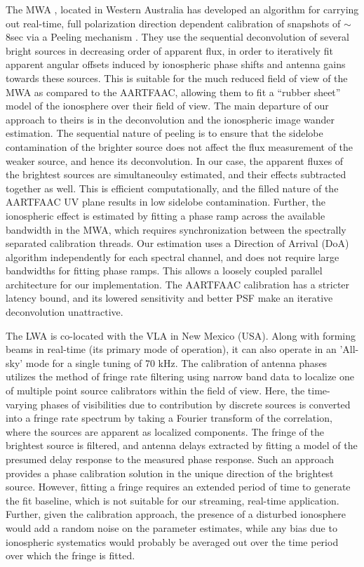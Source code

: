 \documentclass{aa}
\begin{document}
The MWA \citep{lonsdale2009murchison}, located in Western Australia has developed
an algorithm  for carrying out real-time, full  polarization direction dependent
calibration     of     snapshots     of     $\sim$8sec     via     a     Peeling
mechanism \citep{mitchell2008real}.   They use  the  sequential deconvolution  of
several  bright  sources in  decreasing  order of  apparent  flux,  in order  to
iteratively fit apparent angular offsets induced by ionospheric phase shifts and
antenna gains towards these sources. This is suitable for the much reduced field
of view of the MWA as compared  to the AARTFAAC, allowing them to fit a ``rubber
sheet'' model of the ionosphere over their field of view.  The main departure of
our approach to theirs is in  the deconvolution and the ionospheric image wander
estimation.  The  sequential nature  of peeling is  to ensure that  the sidelobe
contamination of the brighter source does not affect the flux measurement of the
weaker source, and hence its deconvolution.  In our case, the apparent fluxes of
the brightest sources are simultaneoulsy estimated, and their effects subtracted
together as  well. This is efficient  computationally, and the  filled nature of
the  AARTFAAC UV  plane  results  in low  sidelobe  contamination. Further,  the
ionospheric effect  is estimated  by fitting a  phase ramp across  the available
bandwidth  in the  MWA, which  requires synchronization  between  the spectrally
separated calibration threads.  Our estimation uses a Direction of Arrival (DoA)
algorithm independently  for each spectral  channel, and does not  require large
bandwidths  for fitting  phase ramps.   This allows  a loosely  coupled parallel
architecture for  our implementation.  The  AARTFAAC calibration has  a stricter
latency  bound, and its  lowered sensitivity  and better  PSF make  an iterative
deconvolution unattractive.

The  LWA \citep{ellingsonLWA1}   is  co-located  with  the  VLA   in  New  Mexico
(USA). Along with forming beams in real-time (its primary mode of operation), it
can  also operate  in an  'All-sky' mode  for  a single  tuning of  70 kHz.  The
calibration of antenna phases utilizes the method of fringe rate filtering using
narrow band data to localize one of multiple point source calibrators within the
field of view. Here, the time-varying phases of visibilities due to contribution
by discrete sources is converted into a fringe rate spectrum by taking a Fourier
transform  of the  correlation,  where  the sources  are  apparent as  localized
components. The fringe  of the brightest source is  filtered, and antenna delays
extracted by  fitting a  model of  the presumed delay  response to  the measured
phase response.  Such an approach provides  a phase calibration  solution in the
unique direction of the brightest source.  However, fitting a fringe requires an
extended period of time to generate  the fit baseline, which is not suitable for
our streaming, real-time application.  Further, given the calibration approach,
the presence of a disturbed ionosphere would add a random noise on the parameter
estimates,  while any  bias due  to  ionospheric systematics  would probably  be
averaged out over the time period over which the fringe is fitted.
\end{document}
